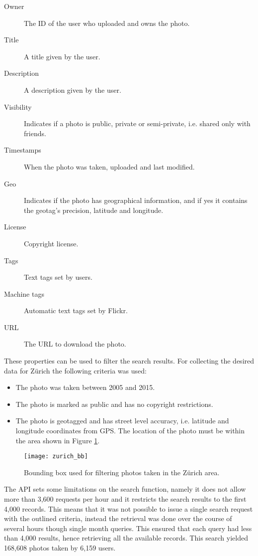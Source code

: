 \begin{description}
  \item[Owner] The ID of the user who uploaded and owns the photo.
  \item[Title] A title given by the user.
  \item[Description] A description given by the user.
  \item[Visibility] Indicates if a photo is public, private or semi-private, i.e. shared only with friends.
  \item[Timestamps] When the photo was taken, uploaded and last modified.
  \item[Geo] Indicates if the photo has geographical information, and if yes it contains the geotag's precision, latitude and longitude.
  \item[License] Copyright license.
  \item[Tags] Text tags set by users.
  \item[Machine tags] Automatic text tags set by Flickr.
  \item[URL] The URL to download the photo. 
\end{description}

These properties can be used to filter the search results. For collecting the desired data for Zürich the following criteria was used:

\begin{itemize}
  \item The photo was taken between 2005 and 2015.
  \item The photo is marked as public and has no copyright restrictions.
  \item The photo is geotagged and has street level accuracy, i.e. latitude and longitude coordinates from GPS. The location of the photo must be within the area shown in Figure \ref{fig:zurich_bb}.
\end{itemize}

\begin{figure}
  \centering
  \texttt{[image: zurich\_bb]}
  \caption{Bounding box used for filtering photos taken in the Zürich area.}
  \label{fig:zurich_bb}
\end{figure}

The API sets some limitations on the search function, namely it does not allow more than 3,600 requests per hour and it restricts the search results to the first 4,000 records. This means that it was not possible to issue a single search request with the outlined criteria, instead the retrieval was done over the course of several hours though single month queries. This ensured that each query had less than 4,000 results, hence retrieving all the available records. This search yielded 168,608 photos taken by 6,159 users.

